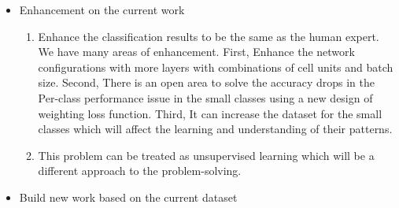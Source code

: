 \begin{itemize}
  \item Enhancement on the current work
  \begin{enumerate}
    \item Enhance the classification results to be the same as the human expert. We have many areas of enhancement. First, Enhance the network configurations with more layers with combinations of cell units and batch size. Second, There is an open area to solve the accuracy drops in the Per-class performance issue in the small classes using a new design of weighting loss function. Third, It can increase the dataset for the small classes which will affect the learning and understanding of their patterns.
    \item This problem can be treated as unsupervised learning which will be a different approach to the problem-solving.
  \end{enumerate}
  \item Build new work based on the current dataset
  
\end{itemize}


